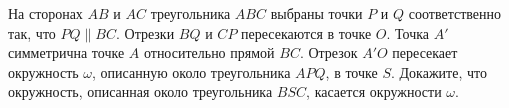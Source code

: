 \documentclass{article}
\begin{document}
\begin{enumerate_boxed}
        \item На сторонах $AB$ и $AC$ треугольника $ABC$ выбраны точки $P$ и $Q$ соответственно так, что $PQ \parallel BC$.
        Отрезки $BQ$ и $CP$ пересекаются в точке $O$.
        Точка $A'$ симметрична точке $A$ относительно прямой $BC$.
        Отрезок $A'O$ пересекает окружность $\omega$, описанную около треугольника $APQ$, в точке $S$.
        Докажите, что окружность, описанная около треугольника $BSC$, касается окружности $\omega$.


    \end{enumerate_boxed}
\end{document}
